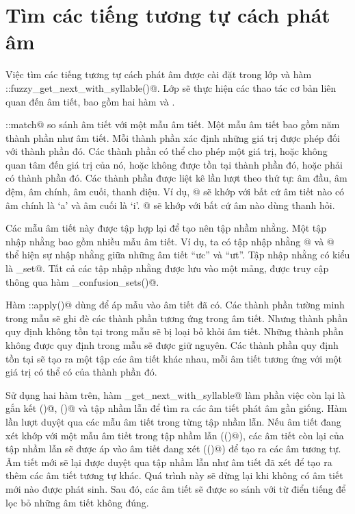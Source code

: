 \documentclass[a4paper,oneside,14pt]{extbook} %
\begin{document}
\section{Tìm các tiếng tương tự cách phát âm}

Việc tìm các tiếng tương tự cách phát âm được cài đặt trong lớp
\verb@Syllable@ và hàm
\verb@FuzzyWordNode::fuzzy_get_next_with_syllable()@. Lớp
\verb@Syllable@ sẽ thực hiện các thao tác cơ bản liên quan đến âm
tiết, bao gồm hai hàm \verb@match@ và \verb@apply@.

\verb@Syllable::match@ so sánh âm tiết với một mẫu âm tiết. Một mẫu
âm tiết bao gồm năm thành phần như âm tiết. Mỗi thành phần xác định
những giá trị được phép đối với thành phần đó. Các thành phần có thể
cho phép một giá trị, hoặc không quan tâm đến giá trị của nó, hoặc
không được tồn tại thành phần đó, hoặc phải có thành phần đó. Các
thành phần được liệt kê lần lượt theo thứ tự: âm đầu, âm đệm, âm
chính, âm cuối, thanh điệu. Ví dụ, \verb@[?,?,a,i,?]@ sẽ
khớp với bất cứ âm tiết nào có âm chính là `a' và âm cuối là
`i'. \verb@[?,?,?,?,Hook]@ sẽ khớp với bất cứ âm nào dùng
thanh hỏi.

Các mẫu âm tiết này được tập hợp lại để tạo nên tập nhầm nhằng. Một
tập nhập nhằng bao gồm nhiều mẫu âm tiết. Ví dụ, ta có tập nhập nhằng
\verb@[?,?,ư,t,?]@ và \verb@[?,?,ư,c,?]@ thể
hiện sự nhập nhằng giữa những âm tiết ``ưc'' và ``ưt''. Tập nhập nhằng
có kiểu là \verb@confusion_set@. Tất cả các tập nhập nhằng được lưu
vào một mảng, được truy cập thông qua hàm \verb@get_confusion_sets()@.

Hàm \verb@Syllable::apply()@ dùng để áp mẫu vào âm tiết đã có. Các
thành phần tường minh trong mẫu sẽ ghi đè các thành phần tương ứng
trong âm tiết. Nhưng thành phần quy định không tồn tại trong mẫu sẽ bị
loại bỏ khỏi âm tiết. Những thành phần không được quy định trong mẫu
sẽ được giữ nguyên. Các thành phần quy định tồn tại sẽ tạo ra một tập
các âm tiết khác nhau, mỗi âm tiết tương ứng với một giá trị có thể có
của thành phần đó.

Sử dụng hai hàm trên, hàm
\verb@fuzzy_get_next_with_syllable@ làm phần việc còn
lại là gắn kết \verb@match()@, \verb@apply()@ và tập nhầm lẫn để tìm
ra các âm tiết phát âm gần giống. Hàm lần lượt duyệt qua các mẫu âm
tiết trong từng tập nhầm lẫn. Nếu âm tiết đang xét khớp với một mẫu âm
tiết trong tập nhầm lẫn (\verb@match()@), các âm tiết còn lại của tập
nhầm lẫn sẽ được áp vào âm tiết đang xét (\verb@apply()@) để tạo ra
các âm tương tự. Âm tiết mới sẽ lại được duyệt qua tập nhầm lẫn như âm
tiết đã xét để tạo ra thêm các âm tiết tương tự khác. Quá trình này sẽ
dừng lại khi không có âm tiết mới nào được phát sinh. Sau đó, các âm
tiết sẽ được so sánh với từ điển tiếng để lọc bỏ những âm tiết không
đúng.
\end{document}
